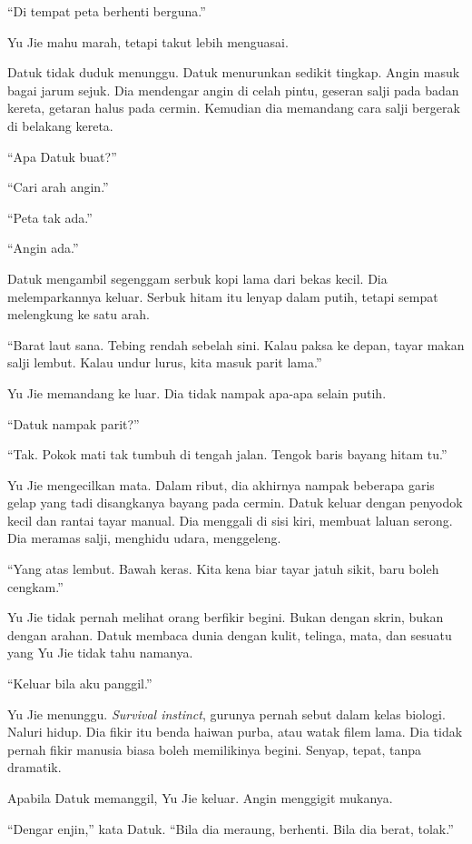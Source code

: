 \documentclass[
  11pt,
  a5paper,
  openany,
  oneside]{book}
\begin{document}
``Di tempat peta berhenti berguna.''

Yu Jie mahu marah, tetapi takut lebih menguasai.

Datuk tidak duduk menunggu. Datuk menurunkan sedikit tingkap. Angin
masuk bagai jarum sejuk. Dia mendengar angin di celah pintu, geseran
salji pada badan kereta, getaran halus pada cermin. Kemudian dia
memandang cara salji bergerak di belakang kereta.

``Apa Datuk buat?''

``Cari arah angin.''

``Peta tak ada.''

``Angin ada.''

Datuk mengambil segenggam serbuk kopi lama dari bekas kecil. Dia
melemparkannya keluar. Serbuk hitam itu lenyap dalam putih, tetapi
sempat melengkung ke satu arah.

``Barat laut sana. Tebing rendah sebelah sini. Kalau paksa ke depan,
tayar makan salji lembut. Kalau undur lurus, kita masuk parit lama.''

Yu Jie memandang ke luar. Dia tidak nampak apa-apa selain putih.

``Datuk nampak parit?''

``Tak. Pokok mati tak tumbuh di tengah jalan. Tengok baris bayang hitam
tu.''

Yu Jie mengecilkan mata. Dalam ribut, dia akhirnya nampak beberapa garis
gelap yang tadi disangkanya bayang pada cermin. Datuk keluar dengan
penyodok kecil dan rantai tayar manual. Dia menggali di sisi kiri,
membuat laluan serong. Dia meramas salji, menghidu udara, menggeleng.

``Yang atas lembut. Bawah keras. Kita kena biar tayar jatuh sikit, baru
boleh cengkam.''

Yu Jie tidak pernah melihat orang berfikir begini. Bukan dengan skrin,
bukan dengan arahan. Datuk membaca dunia dengan kulit, telinga, mata,
dan sesuatu yang Yu Jie tidak tahu namanya.

``Keluar bila aku panggil.''

Yu Jie menunggu. \emph{Survival instinct}, gurunya pernah sebut dalam
kelas biologi. Naluri hidup. Dia fikir itu benda haiwan purba, atau
watak filem lama. Dia tidak pernah fikir manusia biasa boleh memilikinya
begini. Senyap, tepat, tanpa dramatik.

Apabila Datuk memanggil, Yu Jie keluar. Angin menggigit mukanya.

``Dengar enjin,'' kata Datuk. ``Bila dia meraung, berhenti. Bila dia
berat, tolak.''
\end{document}
